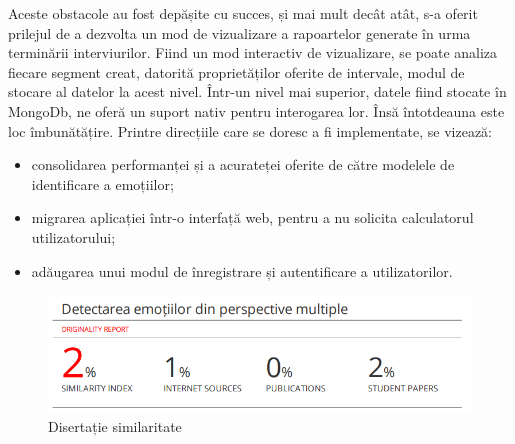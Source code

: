 \documentclass[a4paper, 12pt]{report}
\begin{document}
	Aceste obstacole au fost depășite cu succes, și mai mult decât atât, s-a oferit prilejul de a dezvolta un mod de vizualizare a 	rapoartelor generate în urma terminării interviurilor. Fiind un mod interactiv de vizualizare, se poate analiza fiecare segment creat, datorită proprietăților oferite de intervale, modul de stocare al datelor la acest nivel. Într-un nivel mai superior, datele fiind stocate în MongoDb, ne oferă un suport nativ pentru interogarea lor. Însă întotdeauna este loc îmbunătățire. Printre direcțiile care se doresc a fi implementate, se vizează:
	
	\begin{itemize}
		\item consolidarea performanței și a acurateței oferite de către modelele de identificare a emoțiilor;
		\item migrarea aplicației într-o interfață web, pentru a nu solicita calculatorul utilizatorului;
		\item adăugarea unui modul de înregistrare și autentificare a utilizatorilor.
	\end{itemize}
	
	\clearpage
    \printbibliography
    \clearpage
    \lstlistoflistings
    \clearpage
	\begin{figure}[H]
		\begin{center}
			\includegraphics[scale=0.8]{images/plagiat.PNG}
		\end{center}
		\caption{Disertație similaritate}
		\label{fig:sim}
	\end{figure} 	
\end{document}

